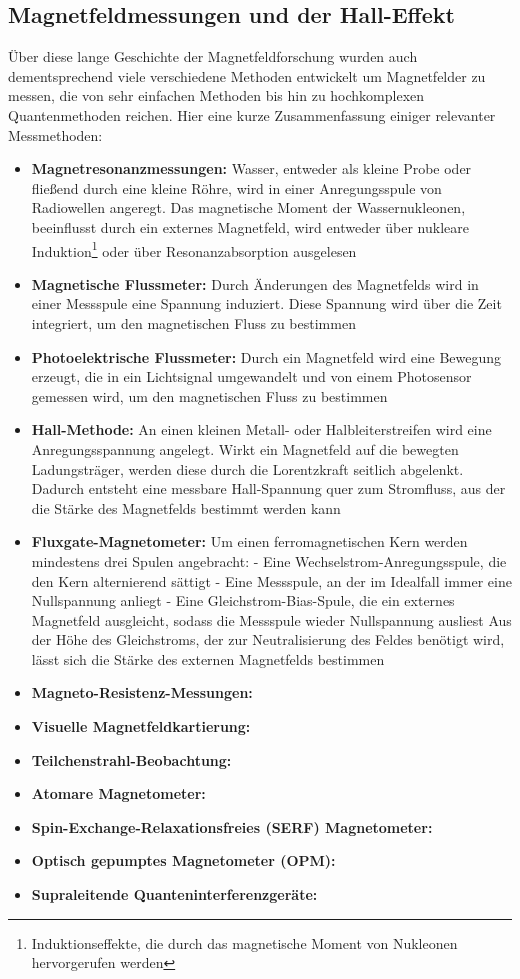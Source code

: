 \documentclass[12pt, a4paper]{article}
\begin{document}
\subsection{Magnetfeldmessungen und der Hall-Effekt}
Über diese lange Geschichte der Magnetfeldforschung wurden auch dementsprechend viele verschiedene Methoden entwickelt um Magnetfelder zu messen, die von sehr einfachen Methoden bis hin zu hochkomplexen Quantenmethoden reichen. Hier eine kurze Zusammenfassung einiger relevanter Messmethoden:
\begin{itemize}
	\item \textbf{Magnetresonanzmessungen:} Wasser, entweder als kleine Probe oder fließend durch eine kleine Röhre, wird in einer Anregungsspule von Radiowellen angeregt. Das magnetische Moment der Wassernukleonen, beeinflusst durch ein externes Magnetfeld, wird entweder über nukleare Induktion\footnote{Induktionseffekte, die durch das magnetische Moment von Nukleonen hervorgerufen werden} oder über Resonanzabsorption ausgelesen
	\item \textbf{Magnetische Flussmeter:} Durch Änderungen des Magnetfelds wird in einer Messspule eine Spannung induziert. Diese Spannung wird über die Zeit integriert, um den magnetischen Fluss zu bestimmen
	\item \textbf{Photoelektrische Flussmeter:} Durch ein Magnetfeld wird eine Bewegung erzeugt, die in ein Lichtsignal umgewandelt und von einem Photosensor gemessen wird, um den magnetischen Fluss zu bestimmen
	\item \textbf{Hall-Methode:} An einen kleinen Metall- oder Halbleiterstreifen wird eine Anregungsspannung angelegt. Wirkt ein Magnetfeld auf die bewegten Ladungsträger, werden diese durch die Lorentzkraft seitlich abgelenkt. Dadurch entsteht eine messbare Hall-Spannung quer zum Stromfluss, aus der die Stärke des Magnetfelds bestimmt werden kann
	\item \textbf{Fluxgate-Magnetometer:} Um einen ferromagnetischen Kern werden mindestens drei Spulen angebracht:
	\subitem - Eine Wechselstrom-Anregungsspule, die den Kern  alternierend sättigt 
	\subitem - Eine Messspule, an der im Idealfall immer eine Nullspannung anliegt
	\subitem - Eine Gleichstrom-Bias-Spule, die ein externes Magnetfeld ausgleicht, sodass die Messspule wieder Nullspannung ausliest
	\newline
	Aus der Höhe des Gleichstroms, der zur Neutralisierung des Feldes benötigt wird, lässt sich die Stärke des externen Magnetfelds bestimmen
	\item \textbf{Magneto-Resistenz-Messungen:}
	\item \textbf{Visuelle Magnetfeldkartierung:}
	\item \textbf{Teilchenstrahl-Beobachtung: }
	\item \textbf{Atomare Magnetometer:}
	\item \textbf{Spin-Exchange-Relaxationsfreies (SERF) Magnetometer:}
	\item \textbf{Optisch gepumptes Magnetometer (OPM):}
	\item \textbf{Supraleitende Quanteninterferenzgeräte:}
\end{itemize}
\end{document}
